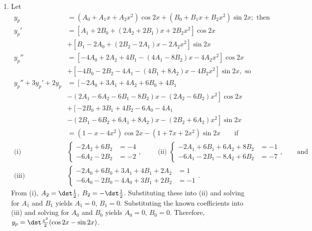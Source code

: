 \documentclass[openany]{book}
\newenvironment{sectionSolutions}{
 \begin{enumerate}[item-label={\thesection.\arabic{enumi}.}]
}{
 \end{enumerate}
}
\begin{document}
\begin{sectionSolutions}
\item
Let
\begin{align*}
y_p&=(A_0+A_1x+A_2x^2)\cos2x +(B_0+B_1x+B_2x^2)\sin2x;\text{ then}\\
y_p'&=\left[A_1+2B_0+(2A_2+2B_1)x+2B_2x^2\right]\cos2x\\
&+\left[B_1-2A_0+(2B_2-2A_1)x-2A_2x^2\right]\sin2x\\
y_p''&=\left[-4A_0+2A_2+4B_1 -(4A_1-8B_2)x-4A_2x^2\right]\cos2x\\
&+ \left[-4B_0-2B_2-4A_1-(4B_1+8A_2)x-4B_2x^2\right]\sin2x,\text{ so}\\
y_p''+3y_p'+2y_p&=\left[-2A_0+3A_1+4A_2+6B_0+4B_1\right.\\
&\left.-(2A_1-6A_2-6B_1-8B_2)x-(2A_2-6B_2)x^2\right]\cos2x\\
&+\left[-2B_0+3B_1+4B_2-6A_0-4A_1\right.\\
&\left.-(2B_1-6B_2+6A_1+8A_2)x-(2B_2+6A_2)x^2\right]\sin2x\\
&=(1-x-4x^2)\cos2x-(1+7x+2x^2)\sin2x \qquad\text{if}\\
\text{(i)}&\begin{cases}-2A_2+6B_2&=-4
\\-6A_2-2B_2&=-2\end{cases},\qquad
\text{ (ii) } \begin{cases} -2A_1+6B_1+6A_2+8B_2&=-1
\\-6A_1-2B_1-8A_2+6B_2&=-7\end{cases},\qquad\text{and}
\\
\text{(iii)}&
\begin{cases}-2A_0+6B_0+3A_1+4B_1+2A_2&=1
\\-6A_0-2B_0-4A_0+3B_1+2B_2&=-1\end{cases}.
\end{align*}
From (i), $A_2=\dst\frac{1}{2}$, $B_2=-\dst\frac{1}{2}$. Substituting
these into (ii) and solving for $A_1$ and $B_1$ yields $A_1=0$,
$B_1=0$. Substituting the known coefficients into (iii) and solving
for $A_0$ and $B_0$ yields $A_0=0$, $B_0=0$. Therefore,
$y_p=\dst\frac{x^2}{2}(\cos2x-\sin2x)$.


\end{sectionSolutions}
\end{document}

